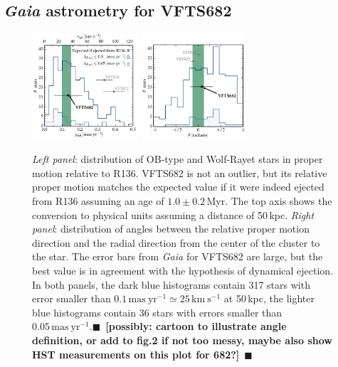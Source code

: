 \documentclass[apjl,twocolumn]{emulateapj}
\newcommand{\todo}[1]{{\large $\blacksquare$~\textbf{\color{red}[#1]}}~$\blacksquare$}
\begin{document}
\subsection{ \emph{Gaia} astrometry for VFTS682\label{data:gaia}}

\begin{figure}[htbp]
  \centering
  \includegraphics[width=0.35\textwidth]{figures/dist_mu_region.pdf}
  \includegraphics[width=0.35\textwidth]{figures/angle}
  \caption{\emph{Left panel}: distribution of OB-type and Wolf-Rayet stars in proper
    motion relative to R136. VFTS682 is not an outlier, but
    its relative proper motion matches the expected value if it were indeed
    ejected from R136 assuming an age of $1.0\pm0.2$\,Myr. The top axis shows the conversion to physical units
    assuming a distance of 50\,kpc. \emph{Right panel}:  distribution of
    angles between the relative proper motion direction and the radial
    direction from the center of the cluster to the star. The error bars from \emph{Gaia} for VFTS682 are large, but
    the best value is in agreement with the hypothesis of dynamical
    ejection. In both
    panels, the dark blue histograms contain 317 
    stars with error smaller than $0.1\,\mathrm{mas \
      yr^{-1}}\simeq25\,\mathrm{km\ s^{-1}}$ at 50\,kpc, the
    lighter blue histograms contain 36 stars with errors smaller than $0.05\,\mathrm{mas \
      yr^{-1}}$.\todo{possibly: cartoon to illustrate angle definition, or add to
    fig.2 if not too messy, maybe also show HST measurements on this
    plot for 682?}}
  \label{fig:dist}
\end{figure}
\end{document}
